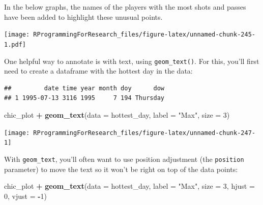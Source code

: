 \documentclass[]{book}
\makeatletter
\newenvironment{Shaded}{\begin{snugshade}}{\end{snugshade}}
\newcommand{\KeywordTok}[1]{\textcolor[rgb]{0.13,0.29,0.53}{\textbf{#1}}}
\newcommand{\DataTypeTok}[1]{\textcolor[rgb]{0.13,0.29,0.53}{#1}}
\newcommand{\DecValTok}[1]{\textcolor[rgb]{0.00,0.00,0.81}{#1}}
\newcommand{\StringTok}[1]{\textcolor[rgb]{0.31,0.60,0.02}{#1}}
\newcommand{\OperatorTok}[1]{\textcolor[rgb]{0.81,0.36,0.00}{\textbf{#1}}}
\newcommand{\NormalTok}[1]{#1}
\newenvironment{kframe}{%
\medskip{}
\setlength{\fboxsep}{.8em}
 \def\at@end@of@kframe{}%
 \ifinner\ifhmode%
  \def\at@end@of@kframe{\end{minipage}}%
  \begin{minipage}{\columnwidth}%
 \fi\fi%
 \def\FrameCommand##1{\hskip\@totalleftmargin \hskip-\fboxsep
 \colorbox{shadecolor}{##1}\hskip-\fboxsep
     \hskip-\linewidth \hskip-\@totalleftmargin \hskip\columnwidth}%
 \MakeFramed {\advance\hsize-\width
   \@totalleftmargin\z@ \linewidth\hsize
   \@setminipage}}%
 {\par\unskip\endMakeFramed%
 \at@end@of@kframe}
\renewenvironment{Shaded}{\begin{kframe}}{\end{kframe}}
\theoremstyle{definition}
\theoremstyle{definition}
\theoremstyle{definition}
\theoremstyle{remark}
\makeatother
\begin{document}
In the below graphs, the names of the players with the most shots and
passes have been added to highlight these unusual points. \bigskip

\texttt{[image: RProgrammingForResearch\_files/figure-latex/unnamed-chunk-245-1.pdf]}

One helpful way to annotate is with text, using \texttt{geom\_text()}.
For this, you'll first need to create a dataframe with the hottest day
in the data:

\begin{Shaded}
\end{Shaded}

\begin{verbatim}
##         date time year month doy      dow
## 1 1995-07-13 3116 1995     7 194 Thursday
\end{verbatim}

\begin{Shaded}
\begin{Highlighting}[]
\NormalTok{chic_plot }\OperatorTok{+}\StringTok{ }\KeywordTok{geom_text}\NormalTok{(}\DataTypeTok{data =}\NormalTok{ hottest_day, }
                      \DataTypeTok{label =} \StringTok{"Max"}\NormalTok{,}
                      \DataTypeTok{size =} \DecValTok{3}\NormalTok{)}
\end{Highlighting}
\end{Shaded}

\begin{center}\texttt{[image: RProgrammingForResearch\_files/figure-latex/unnamed-chunk-247-1]} \end{center}

With \texttt{geom\_text}, you'll often want to use position adjustment
(the \texttt{position} parameter) to move the text so it won't be right
on top of the data points:

\begin{Shaded}
\begin{Highlighting}[]
\NormalTok{chic_plot }\OperatorTok{+}\StringTok{ }\KeywordTok{geom_text}\NormalTok{(}\DataTypeTok{data =}\NormalTok{ hottest_day, }
                      \DataTypeTok{label =} \StringTok{"Max"}\NormalTok{,}
                      \DataTypeTok{size =} \DecValTok{3}\NormalTok{, }\DataTypeTok{hjust =} \DecValTok{0}\NormalTok{, }\DataTypeTok{vjust =} \OperatorTok{-}\DecValTok{1}\NormalTok{)}
\end{Highlighting}
\end{Shaded}
\end{document}
